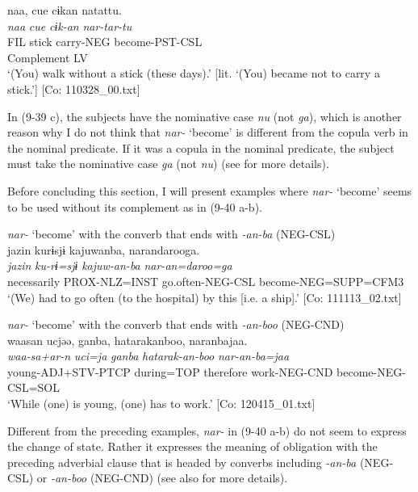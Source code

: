 \ex \label{ex:9.39d} %
    \gllll  naa,  {\textbar}cue{\textbar}  cɨkan  natattu.\\
      \textit{naa}  \textit{cue}  \textit{cɨk-an}  \textit{nar{}-tar-tu}\\
      FIL  stick  carry-NEG  become-PST-CSL\\
          Complement  LV\\
      \glt       ‘(You) walk without a stick (these days).’ [lit. ‘(You) became not to carry a stick.’] [Co: 110328\_00.txt]
    \z
\z

In (9-39 c), the subjects have the nominative case \textit{nu} (not \textit{ga}), which is another reason why I do not think that \textit{nar-} ‘become’ is different from the copula verb in the nominal predicate. If it was a copula in the nominal predicate, the subject must take the nominative case \textit{ga} (not \textit{nu}) (see  for more details).

Before concluding this section, I will present examples where \textit{nar-} ‘become’ seems to be used without its complement as in (9-40 a-b).

\ea \label{ex:9.40}

\ea \textit{nar-} ‘become’ with the converb that ends with \textit{{}-an-ba} (NEG-CSL)\\
 \glll  jazin  kurɨsjɨ  kajuwanba,  narandarooga.\\
    \textit{jazin}  \textit{ku-rɨ=sjɨ}  \textit{kajuw-an-ba}  \textit{nar-an=daroo=ga}\\
    necessarily  PROX-NLZ=INST  go.often-NEG-CSL  become-NEG=SUPP=CFM3\\
    \glt     ‘(We) had to go often (to the hospital) by this [i.e. a ship].’ [Co: 111113\_02.txt]

\ex\textit{nar-} ‘become’ with the converb that ends with \textit{{}-an-boo} (NEG-CND)\\
 \glll  waasan  ucjəə,  ganba,  hatarakanboo, naranbajaa.\\
    \textit{waa-sa+ar-n}  \textit{uci=ja}  \textit{ganba}  \textit{hatarak-an-boo}  \textit{nar-an-ba=jaa}\\
    young-ADJ+STV-PTCP  during=TOP  therefore  work-NEG-CND  become-NEG-CSL=SOL\\
  \glt     ‘While (one) is young, (one) has to work.’ [Co: 120415\_01.txt]
  \z
\z

Different from the preceding examples, \textit{nar-} in (9-40 a-b) do not seem to express the change of state. Rather it expresses the meaning of obligation with the preceding adverbial clause that is headed by converbs including \textit{{}-an-ba} (NEG-CSL) or \textit{{}-an-boo} (NEG-CND) (see also  for more details).

